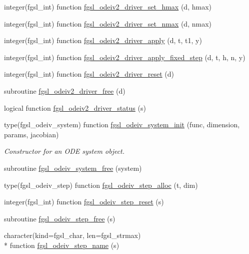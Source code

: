 \begin{DoxyCompactItemize}
\item 
integer(fgsl\-\_\-int) function \hyperlink{ode_8finc_a524a858cffa85f419e05e2da0a21f813}{fgsl\-\_\-odeiv2\-\_\-driver\-\_\-set\-\_\-hmax} (d, hmax)
\item 
integer(fgsl\-\_\-int) function \hyperlink{ode_8finc_a672eeb10000330826020da95ce99c391}{fgsl\-\_\-odeiv2\-\_\-driver\-\_\-set\-\_\-nmax} (d, nmax)
\item 
integer(fgsl\-\_\-int) function \hyperlink{ode_8finc_a6cd36ae8668cd6a69d3d8b4200df210d}{fgsl\-\_\-odeiv2\-\_\-driver\-\_\-apply} (d, t, t1, y)
\item 
integer(fgsl\-\_\-int) function \hyperlink{ode_8finc_a9eedde9d2faadc18f0d952e48b364f04}{fgsl\-\_\-odeiv2\-\_\-driver\-\_\-apply\-\_\-fixed\-\_\-step} (d, t, h, n, y)
\item 
integer(fgsl\-\_\-int) function \hyperlink{ode_8finc_abf08671d0ef862295d6bf5fd2b9733b2}{fgsl\-\_\-odeiv2\-\_\-driver\-\_\-reset} (d)
\item 
subroutine \hyperlink{ode_8finc_a1bd2c2d5a3b6758b0a2bf84c64e14c49}{fgsl\-\_\-odeiv2\-\_\-driver\-\_\-free} (d)
\item 
logical function \hyperlink{ode_8finc_af058bdba2f220e7f306c7dac6fefc7e8}{fgsl\-\_\-odeiv2\-\_\-driver\-\_\-status} (s)
\item 
type(fgsl\-\_\-odeiv\-\_\-system) function \hyperlink{ode_8finc_ac5419ee4b9617d0020895e1f452e0ec8}{fgsl\-\_\-odeiv\-\_\-system\-\_\-init} (func, dimension, params, jacobian)
\begin{DoxyCompactList}\small\item\em Constructor for an O\-D\-E system object. \end{DoxyCompactList}\item 
subroutine \hyperlink{ode_8finc_a4fad8d181c7842450901cd34bf9902c5}{fgsl\-\_\-odeiv\-\_\-system\-\_\-free} (system)
\item 
type(fgsl\-\_\-odeiv\-\_\-step) function \hyperlink{ode_8finc_ad80515e2f8704ae9c376357ff184c0b5}{fgsl\-\_\-odeiv\-\_\-step\-\_\-alloc} (t, dim)
\item 
integer(fgsl\-\_\-int) function \hyperlink{ode_8finc_a550b05385e72fdf0e9c8febe9d9c0556}{fgsl\-\_\-odeiv\-\_\-step\-\_\-reset} (s)
\item 
subroutine \hyperlink{ode_8finc_ae2d74056a3dd23aaf31cd48dd757a987}{fgsl\-\_\-odeiv\-\_\-step\-\_\-free} (s)
\item 
character(kind=fgsl\-\_\-char, len=fgsl\-\_\-strmax) \\*
function \hyperlink{ode_8finc_a1266ca2607d99bd8f30801f7c5837f6b}{fgsl\-\_\-odeiv\-\_\-step\-\_\-name} (s)

\end{DoxyCompactItemize}
